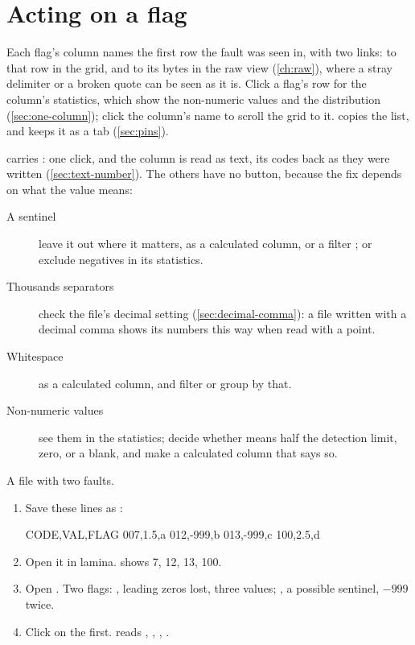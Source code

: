 \section{Acting on a flag}\label{sec:dq-act}

Each flag's  column names the first row the fault was seen in, with two links:  to
that row in the grid, and  to its bytes in the raw view (\cref{ch:raw}), where a stray delimiter
or a broken quote can be seen as it is. Click a flag's row for the column's statistics, which show the
non-numeric values and the distribution (\cref{sec:one-column}); click the column's name to scroll the
grid to it.  copies the list, and  keeps it as a tab (\cref{sec:pins}).

 carries : one click, and the column is read as text, its
codes back as they were written (\cref{sec:text-number}). The others have no button, because the fix
depends on what the value means:

\begin{description}
\item[A sentinel] leave it out where it matters,  as a calculated column, or a
filter ; or exclude negatives in its statistics.
\item[Thousands separators] check the file's decimal setting (\cref{sec:decimal-comma}): a file written
with a decimal comma shows its numbers this way when read with a point.
\item[Whitespace]  as a calculated column, and filter or group by that.
\item[Non-numeric values] see them in the statistics; decide whether  means half the
detection limit, zero, or a blank, and make a calculated column that says so.
\end{description}

\begin{tryit}
A file with two faults.
\begin{enumerate}
\item Save these lines as :
\begin{codeblock}
CODE,VAL,FLAG
007,1.5,a
012,-999,b
013,-999,c
100,2.5,d
\end{codeblock}
\item Open it in lamina.  shows 7, 12, 13, 100.
\item Open . Two flags: , leading zeros lost, three values; ,
a possible sentinel, $-999$ twice.
\item Click  on the first.  reads , , ,
.
\end{enumerate}
\end{tryit}
